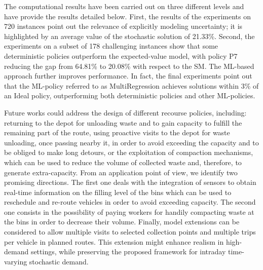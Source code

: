 \documentclass[preprint,11pt,authoryear]{elsarticle}
\begin{document}
The computational results have been carried out on three different levels and have provide the results detailed below. First, the results of the experiments on 720 instances point out the relevance of explicitly modeling uncertainty; it is highlighted by an average value of the stochastic solution of 21.33\%. Second, the experiments on a subset of 178 challenging instances show that some deterministic policies outperform the expected-value model, with policy P7 reducing the gap from 64.81\% to 20.08\% with respect to the SM. The ML-based approach further improves performance. In fact, the final experiments point out that the ML-policy referred to as MultiRegression achieves solutions within 3\% of an Ideal policy, outperforming both deterministic policies and other ML-policies. %

Future works could address the design of 
different recourse policies, including: returning to the depot for unloading waste and to gain capacity to fulfill the remaining part of the route, using proactive visits to the depot for waste unloading, once passing nearby it, in order to avoid exceeding the capacity and to be obliged to make long detours, or the exploitation of compaction mechanisms, which can be used to reduce the volume of collected waste and, therefore, to generate extra-capacity.  
From an application point of view, we identify two promising directions. The first one deals with the integration of sensors to obtain real-time information on the filling level of the bins which can be used to reschedule and re-route vehicles in order to avoid exceeding capacity. The second one consists in the possibility of paying workers for handily compacting waste at the bins in order to decrease their volume. Finally, model extensions can be considered to allow multiple visits to selected collection points and multiple trips per vehicle in planned routes. This extension might enhance realism in high-demand settings, while preserving the proposed framework for intraday time-varying stochastic demand.


\end{document}
